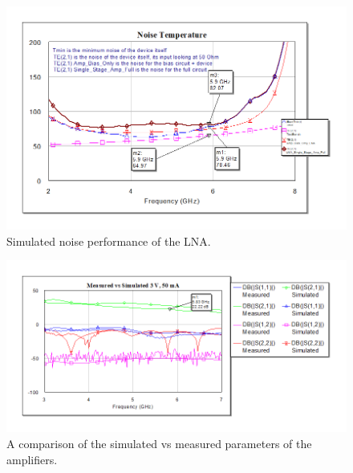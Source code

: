 \documentclass[reprint, aps, prl]{revtex4-1}
\begin{document}
\begin{figure}[!htbp]
    \centering
    \includegraphics[scale=0.35]{LNA_Noise_Temperature.png}
    \caption{Simulated noise performance of the LNA. }
    \label{fig:LNANoiseTemp}
\end{figure}



\begin{figure}[!htbp]
    \centering
    \includegraphics[scale=0.35]{LNA+PA_Measured.png}
    \caption{A comparison of the simulated vs measured parameters of the amplifiers.}
    \label{fig:LNAPAmeas}
\end{figure}
\end{document}
